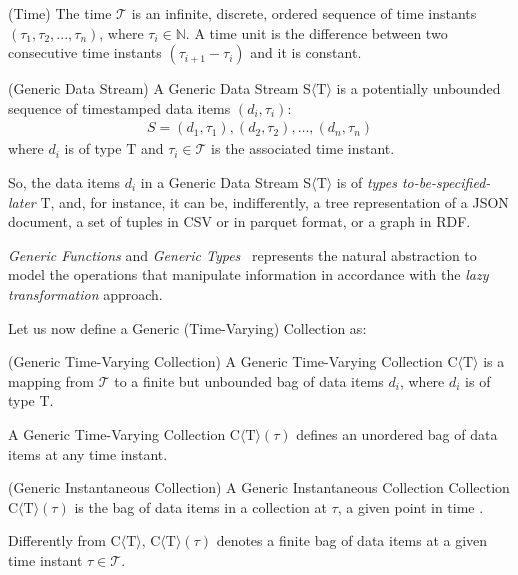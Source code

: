 \begin{Definition}
(Time) The time $\mathcal{T}$ is an infinite, discrete, ordered sequence of time instants $(\tau_1,\tau_2,..., \tau_n)$, where $\tau_i \in \mathbb{N}$. A time unit is the difference between two consecutive time instants $(\tau_{i+1} - \tau_i)$ and it is constant.
\end{Definition}

\begin{Definition}
(Generic Data Stream) A Generic Data Stream S$\langle\mathrm{T}\rangle$ is a potentially unbounded sequence of timestamped data items $(d_i,\tau_i)$:
\noindent\begin{align*}
S = (d_1,\tau_1), (d_2,\tau_2), \ldots, (d_n,\tau_n)
\end{align*}  
where $d_i$ is of type $\mathrm{T}$ and $\tau_i \in \mathcal{T}$ is the associated time instant. 
\end{Definition}

So, the data items $d_i$ in a Generic Data Stream S$\langle\mathrm{T}\rangle$ is of \textit{types to-be-specified-later} $\mathrm{T}$, and, for instance, it can be, indifferently, a tree representation of a JSON document, a set of tuples in CSV or in parquet format, or a graph in RDF.

\textit{Generic Functions} and \textit{Generic Types}~\cite{DBLP:conf/dagstuhl/1998gp} represents the natural abstraction to model the operations that manipulate information in accordance with the \textit{lazy transformation} approach. 

Let us now define a Generic (Time-Varying) Collection as:

\begin{Definition}
(Generic Time-Varying Collection) A Generic Time-Varying Collection C$\langle\mathrm{T}\rangle$ is a mapping from $\mathcal{T}$ to a finite but unbounded bag of data items $d_i$, where $d_i$ is of type $\mathrm{T}$. 
\end{Definition}

A Generic Time-Varying Collection C$\langle\mathrm{T}\rangle(\tau)$ defines an unordered bag of data items at any time instant.

\begin{Definition}
(Generic Instantaneous Collection) A Generic Instantaneous Collection Collection C$\langle\mathrm{T}\rangle(\tau)$ is the bag of data items in a collection at $\tau$, a given point in time . 
\end{Definition}

Differently from C$\langle\mathrm{T}\rangle$, C$\langle\mathrm{T}\rangle(\tau)$ denotes a finite bag of data items at a given time instant $\tau \in \mathcal{T}$. 

